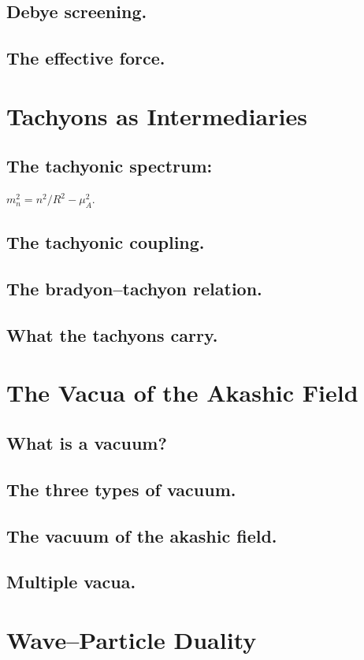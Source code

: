 \subsection{Debye screening.}
\subsection{The effective force.}

\section{Tachyons as Intermediaries}
\subsection{The tachyonic spectrum:} $m_n^2 = n^2/R^2 - \mu_A^2$.
\subsection{The tachyonic coupling.}
\subsection{The bradyon--tachyon relation.}
\subsection{What the tachyons carry.}

\section{The Vacua of the Akashic Field}
\subsection{What is a vacuum?}
\subsection{The three types of vacuum.}
\subsection{The vacuum of the akashic field.}
\subsection{Multiple vacua.}

\section{Wave--Particle Duality}
